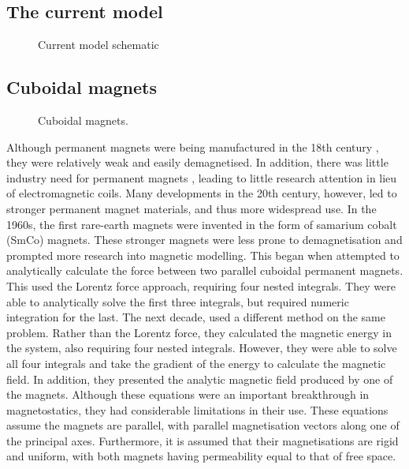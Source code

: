 \subsection{The current model}

\begin{figure}
    \centering
    \vspace{5cm}
    \caption{Current model schematic}
    \label{fig:currentModelSchematic}
\end{figure}

\subsection{Cuboidal magnets}

\begin{figure}
    \centering
    \vspace{5cm}
    \caption{Cuboidal magnets.}
    \label{fig:cuboidalMagnetsSchematic}
\end{figure}

Although permanent magnets were being manufactured in the 18th century \cite{Moskowitz1995}, they were relatively weak and easily demagnetised. In addition, there was little industry need for permanent magnets \cite{Moskowitz1995}, leading to little research attention in lieu of electromagnetic coils. Many developments in the 20th century, however, led to stronger permanent magnet materials, and thus more widespread use. In the 1960s, the first rare-earth magnets were invented in the form of samarium cobalt (SmCo) magnets. These stronger magnets were less prone to demagnetisation and prompted more research into magnetic modelling. This began when \textcite{Tsui1972} attempted to analytically calculate the force between two parallel cuboidal permanent magnets. This used the Lorentz force approach, requiring four nested integrals. They were able to analytically solve the first three integrals, but required numeric integration for the last. The next decade, \textcite{Akoun1984} used a different method on the same problem. Rather than the Lorentz force, they calculated the magnetic energy in the system, also requiring four nested integrals. However, they were able to solve all four integrals and take the gradient of the energy to calculate the magnetic field. In addition, they presented the analytic magnetic field produced by one of the magnets. Although these equations were an important breakthrough in magnetostatics, they had considerable limitations in their use. These equations assume the magnets are parallel, with parallel magnetisation vectors along one of the principal axes. Furthermore, it is assumed that their magnetisations are rigid and uniform, with both magnets having permeability equal to that of free space.

